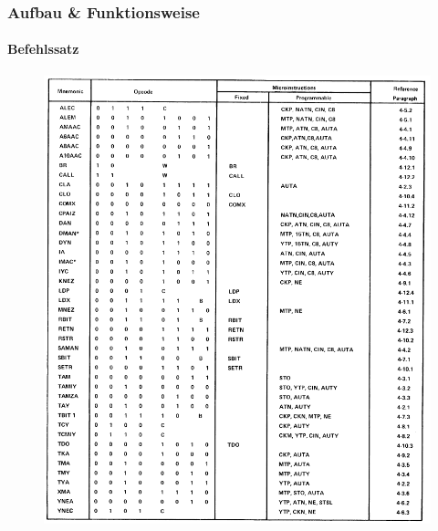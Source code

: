 \begin{frame}
\frametitle{Aufbau \& Funktionsweise}
	\framesubtitle{Befehlssatz}
		\begin{figure}
			\centering
				\includegraphics[scale=0.25]{images/INSTRUCT.PNG}
		\end{figure}
\end{frame}


